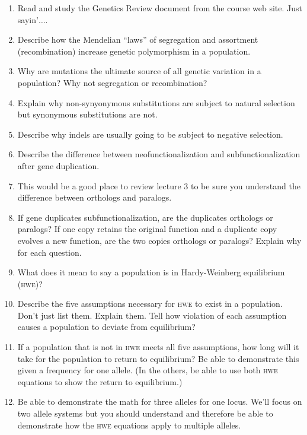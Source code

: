 \documentclass[letterpaper]{tufte-handout}
\begin{document}
\begin{enumerate}
	
	\item Read and study the Genetics Review document from the course web site. Just sayin’$\dots$.
	
	\item Describe how the Mendelian “laws” of segregation and assortment (recombination) increase genetic polymorphism in a population.
	
	\item Why are mutations the ultimate source of all genetic variation in a population? Why not segregation or recombination?
	
	\item Explain why non-synyonymous substitutions are subject to natural selection but synonymous substitutions are not.
	
	\item Describe why indels are usually going to be subject to negative selection.
	
	\item Describe the difference between neofunctionalization and subfunctionalization after gene duplication.
	
	\item This would be a good place to review lecture 3 to be sure you understand the difference between orthologs and paralogs.  
	
	\item If gene duplicates subfunctionalization, are the duplicates orthologs or paralogs? If one copy retains the original function and a duplicate copy evolves a new function, are the two copies orthologs or paralogs? Explain why for each question.
	
	\item What does it mean to say a population is in Hardy-Weinberg equilibrium (\textsc{hwe})?
	
	\item Describe the five assumptions necessary for \textsc{hwe} to exist in a population. Don't just list them. Explain them. Tell how violation of each assumption causes a population to deviate from equilibrium?
	
	\item If a population that is not in \textsc{hwe} meets all five assumptions, how long will it take for the population to return to equilibrium? Be able to demonstrate this given a frequency for one allele. (In the others, be able to use both \textsc{hwe} equations to show the return to equilibrium.)
	
	\item Be able to demonstrate the math for three alleles for one locus. We'll focus on two allele systems but you should understand and therefore be able to demonstrate how the \textsc{hwe} equations apply to multiple alleles. 
	

\end{enumerate}
\end{document}
